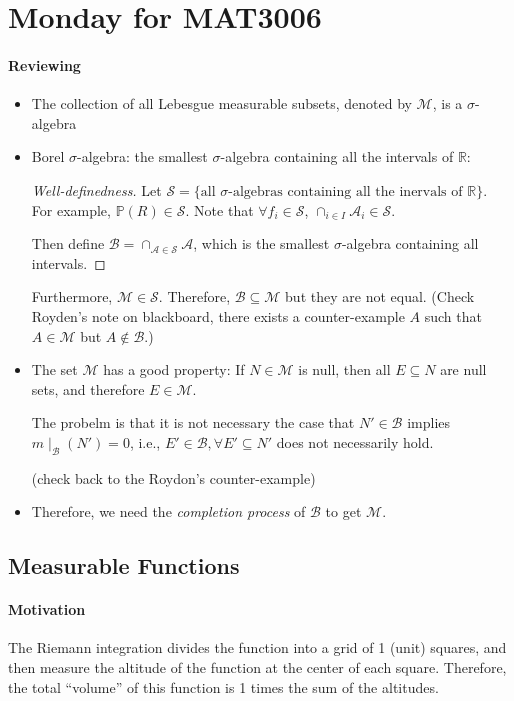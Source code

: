 
\section{Monday for MAT3006}

\paragraph{Reviewing}
\begin{itemize}
\item
The collection of all Lebesgue measurable subsets, denoted by $\mathcal{M}$,
is a $\sigma$-algebra
\item
Borel $\sigma$-algebra: the smallest $\sigma$-algebra containing all the intervals of $\mathbb{R}$:
\begin{proof}[Well-definedness]
Let $\mathcal{S}=\{\text{all $\sigma$-algebras containing all the inervals of $\mathbb{R}$}\}$.
For example, $\mathbb{P}(R)\in\mathcal{S}$.
Note that $\forall f_i\in\mathcal{S}$, $\cap_{i\in I}\mathcal{A}_i\in\mathcal{S}$.

Then define 
$\mathcal{B}=\cap_{\mathcal{A}\in\mathcal{S}}\mathcal{A}$, 
which is the smallest $\sigma$-algebra containing all intervals.
\end{proof}

Furthermore, $\mathcal{M}\in\mathcal{S}$. Therefore, $\mathcal{B}\subseteq\mathcal{M}$ but they are not equal.
(Check Royden's note on blackboard, there exists a counter-example $A$ such that $A\in\mathcal{M}$ but $A\notin\mathcal{B}$.)

\item
The set $\mathcal{M}$ has a good property: 
If $N\in\mathcal{M}$ is null, 
then all $E\subseteq N$ are null sets, 
and therefore $E\in\mathcal{M}$.

The probelm is that it is not necessary the case that $N'\in\mathcal{B}$ implies $m\mid_{\mathcal{B}}(N')=0$, i.e., $E'\in\mathcal{B},\forall E'\subseteq N'$ does not necessarily hold.

(check back to the Roydon's counter-example)
\item
Therefore, we need the \emph{completion process} of $\mathcal{B}$ to get $\mathcal{M}$.
\end{itemize}

\subsection{Measurable Functions}
\paragraph{Motivation}
The Riemann integration divides the function into a grid of 1 (unit) squares, and then measure the altitude of the function at the center of each square.
Therefore, the total ``volume'' of this function is 1 times the sum of the altitudes.

